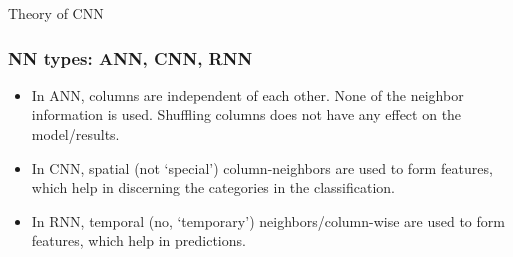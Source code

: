 % 
% 
% 
% 

% 
% 
% 



\begin{frame}
  \begin{center}
    {\Large Theory of CNN}
  \end{center}
\end{frame}

\begin{frame}[fragile] \frametitle{NN types: ANN, CNN, RNN}

\begin{itemize}
\item In ANN, columns are independent of each other. None of the neighbor information is used. Shuffling columns does not have any effect on the model/results.
\item In CNN, spatial (not `special') column-neighbors are used to form features, which help in discerning the categories in the classification.
\item In RNN, temporal (no, `temporary') neighbors/column-wise are used to form features, which help in predictions.
\end{itemize}



\end{frame}




